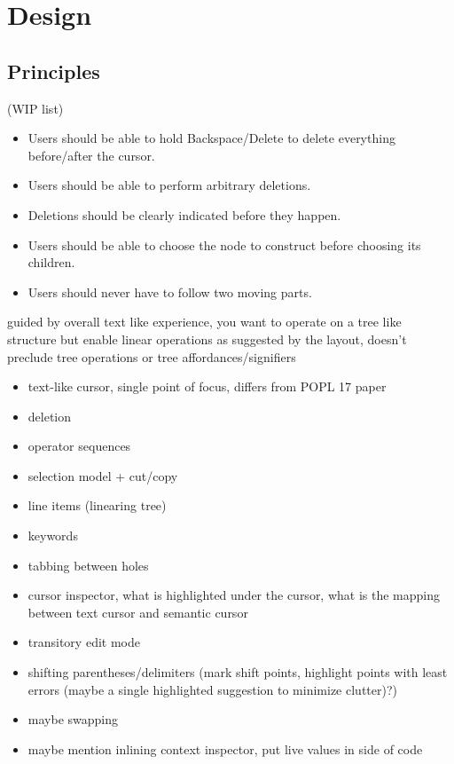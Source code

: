\documentclass[runningheads]{llncs}
\begin{document}
\section{Design} \label{sec:design}

\subsection{Principles}

(WIP list)
\begin{itemize}
\item Users should be able to hold Backspace/Delete to delete everything before/after the cursor.
\item Users should be able to perform arbitrary deletions.
\item Deletions should be clearly indicated before they happen.
\item Users should be able to choose the node to construct before choosing its children.
\item Users should never have to follow two moving parts.
\end{itemize}

guided by overall text like experience, you want to operate on a tree like structure but enable linear operations as suggested by the layout, doesn't preclude tree operations or tree affordances/signifiers
\begin{itemize}
\item text-like cursor, single point of focus, differs from POPL 17 paper
\item deletion
\item operator sequences
\item selection model + cut/copy
\item line items (linearing tree)
\item keywords
\item tabbing between holes
\item cursor inspector, what is highlighted under the cursor, what is the mapping between text cursor and semantic cursor
\item transitory edit mode
\item shifting parentheses/delimiters (mark shift points, highlight points with least errors (maybe a single highlighted suggestion to minimize clutter)?)
\item maybe swapping
\item maybe mention inlining context inspector, put live values in side of code
\end{itemize}
\end{document}
